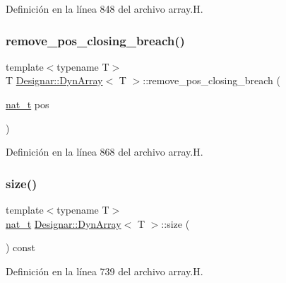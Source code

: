Definición en la línea 848 del archivo array.\+H.

\mbox{\label{class_designar_1_1_dyn_array_ac7451bfdc3b008a478fbfe03478e736d}} 
\subsubsection{\texorpdfstring{remove\+\_\+pos\+\_\+closing\+\_\+breach()}{remove\_pos\_closing\_breach()}}
{\footnotesize\ttfamily template$<$typename T$>$ \\
T \hyperlink{class_designar_1_1_dyn_array}{Designar\+::\+Dyn\+Array}$<$ T $>$\+::remove\+\_\+pos\+\_\+closing\+\_\+breach (\begin{DoxyParamCaption}\item[{\hyperlink{namespace_designar_aa72662848b9f4815e7bf31a7cf3e33d1}{nat\+\_\+t}}]{pos }\end{DoxyParamCaption})\hspace{0.3cm}{\ttfamily [inline]}}



Definición en la línea 868 del archivo array.\+H.

\mbox{\label{class_designar_1_1_dyn_array_a7261fdb2ace9cdefbacb49d06c2f919d}} 
\subsubsection{\texorpdfstring{size()}{size()}}
{\footnotesize\ttfamily template$<$typename T$>$ \\
\hyperlink{namespace_designar_aa72662848b9f4815e7bf31a7cf3e33d1}{nat\+\_\+t} \hyperlink{class_designar_1_1_dyn_array}{Designar\+::\+Dyn\+Array}$<$ T $>$\+::size (\begin{DoxyParamCaption}{ }\end{DoxyParamCaption}) const\hspace{0.3cm}{\ttfamily [inline]}}



Definición en la línea 739 del archivo array.\+H.

